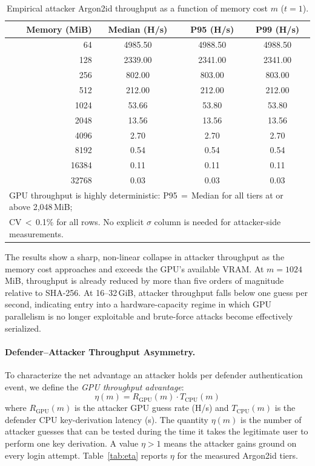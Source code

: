 \documentclass[journal,article,accept,pdftex,moreauthors]{Definitions/mdpi}
\begin{document}
\begin{table}[H]
\caption{Empirical attacker Argon2id throughput as a function of memory cost $m$ ($t=1$).}
\label{tab:argon2_spectrum}
\centering
\begin{tabular}{rccc}
\toprule
\textbf{Memory (MiB)} & \textbf{Median (H/s)} & \textbf{P95 (H/s)} & \textbf{P99 (H/s)} \\
\midrule
64    & 4985.50 & 4988.50 & 4988.50 \\
128   & 2339.00 & 2341.00 & 2341.00 \\
256   & 802.00  & 803.00  & 803.00  \\
512   & 212.00  & 212.00  & 212.00  \\
\midrule
1024  & 53.66   & 53.80   & 53.80   \\
2048  & 13.56   & 13.56   & 13.56   \\
4096  & 2.70    & 2.70    & 2.70    \\
8192  & 0.54    & 0.54    & 0.54    \\
\midrule
16384 & 0.11    & 0.11    & 0.11    \\
32768 & 0.03    & 0.03    & 0.03    \\
\bottomrule
\multicolumn{4}{l}{\footnotesize GPU throughput is highly deterministic: P95\,$=$\,Median for all tiers at or above 2{,}048\,MiB;}\\
\multicolumn{4}{l}{\footnotesize CV\,$<\,$0.1\% for all rows. No explicit $\sigma$ column is needed for attacker-side measurements.}
\end{tabular}
\end{table}

The results show a sharp, non-linear collapse in attacker throughput as the memory cost approaches and exceeds the GPU’s available VRAM. At $m = 1024$\,MiB, throughput is already reduced by more than five orders of magnitude relative to SHA-256. At 16--32\,GiB, attacker throughput falls below one guess per second, indicating entry into a hardware-capacity regime in which GPU parallelism is no longer exploitable and brute-force attacks become effectively serialized.

\paragraph{Defender--Attacker Throughput Asymmetry.}
To characterize the net advantage an attacker holds per defender authentication event, we define the \emph{GPU throughput advantage}:
\begin{equation}
    \eta(m) = R_\text{GPU}(m) \cdot T_\text{CPU}(m)
    \label{eq:eta}
\end{equation}
where $R_\text{GPU}(m)$ is the attacker GPU guess rate (H/s) and $T_\text{CPU}(m)$ is the defender CPU key-derivation latency (s). The quantity $\eta(m)$ is the number of attacker guesses that can be tested during the time it takes the legitimate user to perform one key derivation. A value $\eta > 1$ means the attacker gains ground on every login attempt. Table~\ref{tab:eta} reports $\eta$ for the measured Argon2id tiers.
\end{document}
